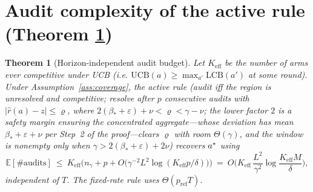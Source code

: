 \documentclass[11pt]{article}
\newtheorem{theorem}{Theorem}
\theoremstyle{definition}\newtheorem{definition}{Definition}
\theoremstyle{definition}\newtheorem{assumption}{Assumption}
\newcommand{\E}{\mathbb{E}}\newcommand{\Prob}{\mathbb{P}}
\newcommand{\nfl}{\nu}                      %
\begin{document}
\section{Audit complexity of the active rule (Theorem \texorpdfstring{\ref*{thm:audit}}{4})}
\label{app:audit}

\begin{theorem}[Horizon-independent audit budget]\label{thm:audit}
Let $K_{\mathrm{eff}}$ be the number of arms ever competitive under UCB (i.e.
$\mathrm{UCB}(a)\ge\max_{a'}\mathrm{LCB}(a')$ at some round). Under
Assumption~\ref{ass:coverage}, the active rule (audit iff the region is
unresolved \emph{and} competitive; resolve after $p$ consecutive audits with
$|\hat r(a)-z|\le\varrho$, where $2(\beta_\ast+\varepsilon)+\nfl<\varrho<
\gamma-\nfl$; the lower factor $2$ is a safety margin ensuring the concentrated
aggregate---whose deviation has mean $\beta_\ast+\varepsilon+\nfl$ per Step~2 of the
proof---clears $\varrho$ with room $\Theta(\gamma)$, and the window is nonempty only
when $\gamma>2(\beta_\ast+\varepsilon)+2\nfl$) recovers $a^{\ast}$ using
\[
\E[\#\text{audits}]\ \le\ K_{\mathrm{eff}}\Big(n_\gamma+p+
O\big(\gamma^{-2}L^2\log(K_{\mathrm{eff}}p/\delta)\big)\Big)
\ =\ O\!\Big(K_{\mathrm{eff}}\,\frac{L^{2}}{\gamma^{2}}\log\frac{K_{\mathrm{eff}}M}{\delta}\Big),
\]
independent of $T$. The fixed-rate rule uses $\Theta(p_{\mathrm{ref}}T)$.
\end{theorem}
\end{document}

